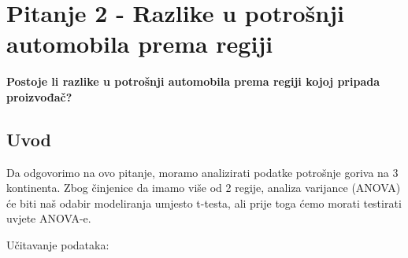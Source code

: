 \documentclass[
]{article}
\newenvironment{Shaded}{\begin{snugshade}}{\end{snugshade}}
\newcommand{\FunctionTok}[1]{\textcolor[rgb]{0.13,0.29,0.53}{\textbf{#1}}}
\newcommand{\NormalTok}[1]{#1}
\newcommand{\OtherTok}[1]{\textcolor[rgb]{0.56,0.35,0.01}{#1}}
\newcommand{\SpecialCharTok}[1]{\textcolor[rgb]{0.81,0.36,0.00}{\textbf{#1}}}
\newcommand{\StringTok}[1]{\textcolor[rgb]{0.31,0.60,0.02}{#1}}
\begin{document}
\section{Pitanje 2 - Razlike u potrošnji automobila prema
regiji}\label{pitanje-2---razlike-u-potroux161nji-automobila-prema-regiji}

\textbf{Postoje li razlike u potrošnji automobila prema regiji kojoj
pripada proizvođač?}

\subsection{Uvod}\label{uvod-1}

Da odgovorimo na ovo pitanje, moramo analizirati podatke potrošnje
goriva na 3 kontinenta. Zbog činjenice da imamo više od 2 regije,
analiza varijance (ANOVA) će biti naš odabir modeliranja umjesto
t-testa, ali prije toga ćemo morati testirati uvjete ANOVA-e.

Učitavanje podataka:

\begin{Shaded}
\end{Shaded}
\end{document}
